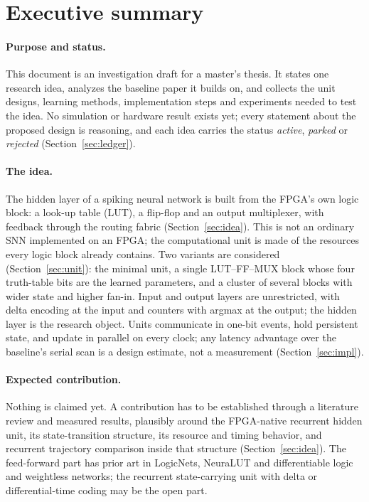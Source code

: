 {}
\section*{Executive summary}

\paragraph{Purpose and status.} This document is an investigation draft for a master's thesis. It states one research idea, analyzes the baseline paper it builds on, and collects the unit designs, learning methods, implementation steps and experiments needed to test the idea. No simulation or hardware result exists yet; every statement about the proposed design is reasoning, and each idea carries the status \emph{active}, \emph{parked} or \emph{rejected} (Section~\ref{sec:ledger}).

\paragraph{The idea.} The hidden layer of a spiking neural network is built from the FPGA's own logic block: a look-up table (LUT), a flip-flop and an output multiplexer, with feedback through the routing fabric (Section~\ref{sec:idea}). This is not an ordinary SNN implemented on an FPGA; the computational unit is made of the resources every logic block already contains. Two variants are considered (Section~\ref{sec:unit}): the minimal unit, a single LUT--FF--MUX block whose four truth-table bits are the learned parameters, and a cluster of several blocks with wider state and higher fan-in. Input and output layers are unrestricted, with delta encoding at the input and counters with argmax at the output; the hidden layer is the research object. Units communicate in one-bit events, hold persistent state, and update in parallel on every clock; any latency advantage over the baseline's serial scan is a design estimate, not a measurement (Section~\ref{sec:impl}).

\paragraph{Expected contribution.} Nothing is claimed yet. A contribution has to be established through a literature review and measured results, plausibly around the FPGA-native recurrent hidden unit, its state-transition structure, its resource and timing behavior, and recurrent trajectory comparison inside that structure (Section~\ref{sec:idea}). The feed-forward part has prior art in LogicNets, NeuraLUT and differentiable logic and weightless networks; the recurrent state-carrying unit with delta or differential-time coding may be the open part.

